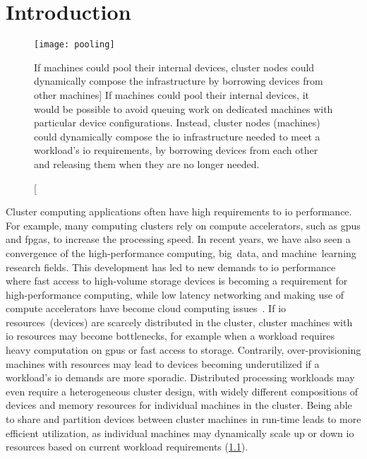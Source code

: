 \chapter{Introduction}\label{chapter:intro}

\begin{figure}
	\centering
	\texttt{[image: pooling]}
    \caption
    [If machines could pool their internal devices, cluster nodes could dynamically compose the  infrastructure by borrowing devices from other machines]
    {If machines could pool their internal devices, it would be possible to avoid queuing work on dedicated machines with particular device configurations. Instead, cluster nodes (machines) could dynamically compose the \gls{io} infrastructure needed to meet a workload's \gls{io} requirements, by borrowing devices from each other and releasing them when they are no longer needed.}
    \label{fig:device-pool}
\end{figure}

Cluster computing applications often have high requirements to \gls{io} performance.
%
For example, many computing clusters rely on compute accelerators, such as \glspl{gpu} and \glspl{fpga}, to increase the processing speed.
%
In recent years, we have also seen a convergence of the high-performance computing, big~data, and machine~learning research fields.
%
This development has led to new demands to \gls{io} performance where fast access to high-volume storage devices is becoming a requirement for high-performance computing, while low latency networking and making use of compute accelerators have become cloud computing issues~\cite{Trivedi2011,Coates2013,Taherkordi2018}.
%
If \gls{io} resources~(devices) are scarcely distributed in the cluster, cluster machines with \gls{io} resources may become bottlenecks, for example when a workload requires heavy computation on \glspl{gpu} or fast access to storage.
%
Contrarily, over-provisioning machines with resources may lead to devices becoming underutilized if a workload's \gls{io} demands are more sporadic.
%
Distributed processing workloads may even require a heterogeneous cluster design, with widely different compositions of devices and memory resources for individual machines in the cluster.
%
Being able to share and partition devices between cluster machines in run-time leads to more efficient utilization, as individual machines may dynamically scale up or down \gls{io} resources based on current workload requirements (\cref{fig:device-pool}).



